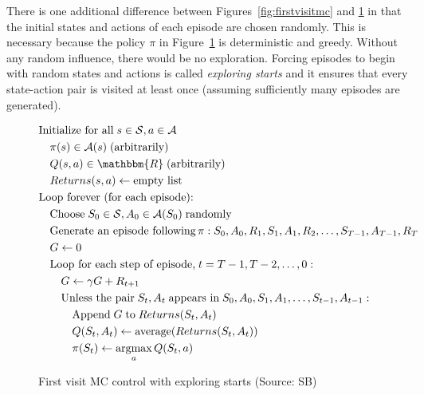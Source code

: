 There is one additional difference between Figures~\ref{fig:firstvisitmc} and \ref{fig:firstvisitcontrol} in that the initial states and actions of each episode are chosen randomly. This is necessary because the policy $\pi$ in Figure~\ref{fig:firstvisitcontrol} is deterministic and greedy. Without any random influence, there would be no exploration. Forcing episodes to begin with random states and actions is called \emph{exploring starts} and it ensures that every state-action pair is visited at least once (assuming sufficiently many episodes are generated).

\begin{figure}
\begin{tcolorbox}[colback=code]
\small
\vspace{-\baselineskip}
\begin{align*}
& \text{Initialize for all}\; s \in \mathcal{S}, a \in \mathcal{A} \\
& \quad \pi(s) \in \mathcal{A}(s) \; \text{(arbitrarily)} \\
& \quad Q(s,a) \in \mathbbm{R}\; \text{(arbitrarily)} \\
& \quad Returns(s, a) \leftarrow \text{empty list} \\
& \text{Loop forever (for each episode):} \\
& \quad \text{Choose}\; S_0 \in \mathcal{S}, A_0 \in \mathcal{A}(S_0)\; \text{randomly} \\
& \quad \text{Generate an episode following}\, \pi: S_0, A_0, R_1, S_1, A_1, R_2, \ldots, S_{T-1}, A_{T-1}, R_{T} \\
& \quad G \leftarrow 0 \\
& \quad \text{Loop for each step of episode,}\; t = T-1, T-2, \ldots, 0: \\
& \quad \quad G \leftarrow \gamma G + R_{t+1} \\
& \quad \quad \text{Unless the pair}\; S_t, A_t \; \text{appears in}\; S_0, A_0, S_1, A_1, \ldots, S_{t-1}, A_{t-1}: \\
& \quad \quad \quad \text{Append}\; G\; \text{to}\; Returns(S_t, A_t) \\
& \quad \quad \quad Q(S_t, A_t) \leftarrow \operatorname{average}(Returns(S_t, A_t)) \\
& \quad \quad \quad \pi(S_t) \leftarrow \operatorname*{arg max}_a Q(S_t, a)
\end{align*}
\end{tcolorbox}
\caption[First visit MC control with exploring starts]{First visit MC control with exploring starts (Source: SB)}
\label{fig:firstvisitcontrol}
\end{figure}

